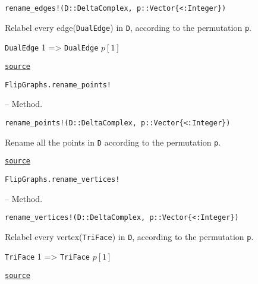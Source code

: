 \begin{adjustwidth}{2em}{0pt}


\begin{verbatim}
rename_edges!(D::DeltaComplex, p::Vector{<:Integer})
\end{verbatim}

Relabel every edge(\texttt{DualEdge}) in \texttt{D}, according to the permutation \texttt{p}.

\texttt{DualEdge} 1 => \texttt{DualEdge} \(p[1]\)



\href{https://github.com/schto223/FlipGraphs.jl/blob/490c01a7adf74b42f27dda05099165c47ae8133e/src/deltaComplex.jl#L1128-L1134}{\texttt{source}}


\end{adjustwidth}
\hypertarget{14975581289018999996}{\texttt{FlipGraphs.rename\_points!}}  -- {Method.}

\begin{adjustwidth}{2em}{0pt}


\begin{verbatim}
rename_points!(D::DeltaComplex, p::Vector{<:Integer})
\end{verbatim}

Rename all the points in \texttt{D} according to the permutation \texttt{p}.



\href{https://github.com/schto223/FlipGraphs.jl/blob/490c01a7adf74b42f27dda05099165c47ae8133e/src/deltaComplex.jl#L1103-L1107}{\texttt{source}}


\end{adjustwidth}
\hypertarget{14047662745601523605}{\texttt{FlipGraphs.rename\_vertices!}}  -- {Method.}

\begin{adjustwidth}{2em}{0pt}


\begin{verbatim}
rename_vertices!(D::DeltaComplex, p::Vector{<:Integer})
\end{verbatim}

Relabel every vertex(\texttt{TriFace}) in \texttt{D}, according to the permutation \texttt{p}.

\texttt{TriFace} 1 => \texttt{TriFace} \(p[1]\) 



\href{https://github.com/schto223/FlipGraphs.jl/blob/490c01a7adf74b42f27dda05099165c47ae8133e/src/deltaComplex.jl#L1114-L1120}{\texttt{source}}


\end{adjustwidth}

